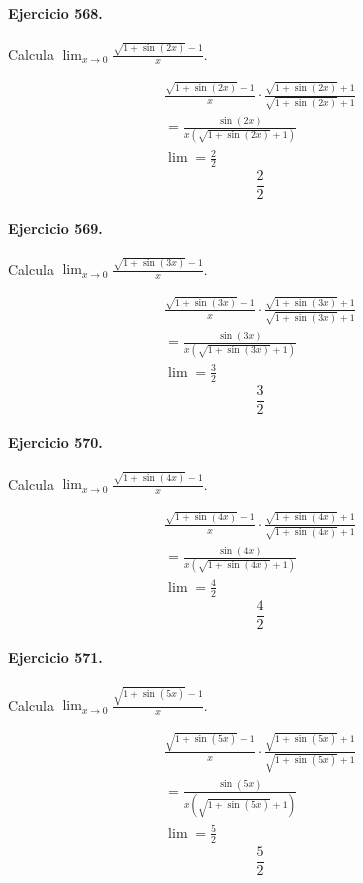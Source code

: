 \documentclass[11pt,a4paper]{article}
\begin{document}
\paragraph{Ejercicio 568.} Calcula $\displaystyle\lim_{x\to0}\frac{\sqrt{1+\sin(2x)}-1}{x}$.

\[
\begin{aligned}
\frac{\sqrt{1+\sin(2x)}-1}{x}\cdot \frac{\sqrt{1+\sin(2x)}+1}{\sqrt{1+\sin(2x)}+1}\\
=\frac{\sin(2x)}{x(\sqrt{1+\sin(2x)}+1)}\\
\lim=\frac{2}{2}
\end{aligned}
\]
\[\boxed{\frac{2}{2}}\]


\paragraph{Ejercicio 569.} Calcula $\displaystyle\lim_{x\to0}\frac{\sqrt{1+\sin(3x)}-1}{x}$.

\[
\begin{aligned}
\frac{\sqrt{1+\sin(3x)}-1}{x}\cdot \frac{\sqrt{1+\sin(3x)}+1}{\sqrt{1+\sin(3x)}+1}\\
=\frac{\sin(3x)}{x(\sqrt{1+\sin(3x)}+1)}\\
\lim=\frac{3}{2}
\end{aligned}
\]
\[\boxed{\frac{3}{2}}\]


\paragraph{Ejercicio 570.} Calcula $\displaystyle\lim_{x\to0}\frac{\sqrt{1+\sin(4x)}-1}{x}$.

\[
\begin{aligned}
\frac{\sqrt{1+\sin(4x)}-1}{x}\cdot \frac{\sqrt{1+\sin(4x)}+1}{\sqrt{1+\sin(4x)}+1}\\
=\frac{\sin(4x)}{x(\sqrt{1+\sin(4x)}+1)}\\
\lim=\frac{4}{2}
\end{aligned}
\]
\[\boxed{\frac{4}{2}}\]


\paragraph{Ejercicio 571.} Calcula $\displaystyle\lim_{x\to0}\frac{\sqrt{1+\sin(5x)}-1}{x}$.

\[
\begin{aligned}
\frac{\sqrt{1+\sin(5x)}-1}{x}\cdot \frac{\sqrt{1+\sin(5x)}+1}{\sqrt{1+\sin(5x)}+1}\\
=\frac{\sin(5x)}{x(\sqrt{1+\sin(5x)}+1)}\\
\lim=\frac{5}{2}
\end{aligned}
\]
\[\boxed{\frac{5}{2}}\]
\end{document}
